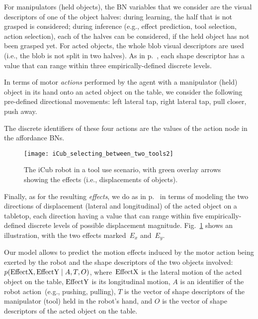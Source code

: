 For manipulators (held objects), the \acl{BN} variables that we consider are the visual descriptors of one of the object halves: during learning, the half that is not grasped is considered; during inference (e.g., effect prediction, tool selection, action selection), each of the halves can be considered, if the held object has not been grasped yet.
For acted objects, the whole blob visual descriptors are used (i.e., the blob is not split in two halves).
As in p.~\pageref{para:objects}, each shape descriptor has a value that can range within three empirically-defined discrete levels.

In terms of motor \emph{actions} performed by the agent with a manipulator (held) object in its hand onto an acted object on the table, we consider the following pre-defined directional movements:
left lateral tap,
right lateral tap,
pull closer,
push away.

The discrete identifiers of these four actions are the values of the action node in the affordance \acp{BN}.

\begin{figure}
\centering
\texttt{[image: iCub\_selecting\_between\_two\_tools2]}
\caption{The iCub robot in a tool use scenario, with green overlay arrows showing the effects (i.e., displacements of objects).}
\label{fig:iCub_selecting_between_two_tools_green_overlays}
\end{figure}

Finally, as for the resulting \emph{effects}, we do as in p.~\pageref{para:effects} in terms of modeling the two directions of displacement (lateral and longitudinal) of the acted object on a tabletop, each direction having a value that can range within five empirically-defined discrete levels of possible displacement magnitude.
Fig.~\ref{fig:iCub_selecting_between_two_tools_green_overlays} shows an illustration, with the two effects marked~$E_x$ and~$E_y$.

Our model allows to predict the motion effects induced by the motor action being exerted by the robot and the shape descriptors of the two objects involved:
$p(\text{EffectX}, \text{EffectY} \mid A, T, O)$,
where~$\text{EffectX}$ is the lateral motion of the acted object on the table,
$\text{EffectY}$ is its longitudinal motion,
$A$ is an identifier of the robot action~(e.g., pushing, pulling),
$T$ is the vector of shape descriptors of the manipulator (tool) held in the robot's hand, and
$O$ is the vector of shape descriptors of the acted object on the table.


